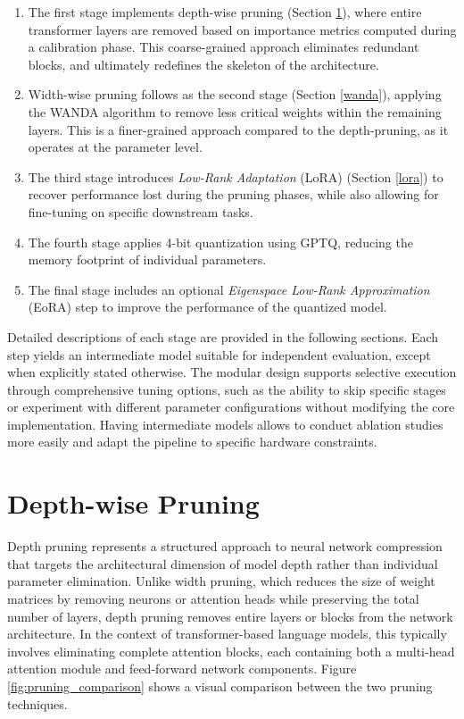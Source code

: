 \begin{enumerate}
    \item The first stage implements depth-wise pruning (Section \ref{depth_pruning}), where entire transformer layers are removed based on importance metrics computed during a calibration phase. This coarse-grained approach eliminates redundant blocks, and ultimately redefines the skeleton of the architecture.

    \item Width-wise pruning follows as the second stage (Section \ref{wanda}), applying the WANDA algorithm to remove less critical weights within the remaining layers. This is a finer-grained approach compared to the depth-pruning, as it operates at the parameter level.

    \item The third stage introduces \textit{Low-Rank Adaptation} (LoRA) (Section \ref{lora}) to recover performance lost during the pruning phases, while also allowing for fine-tuning on specific downstream tasks.

    \item The fourth stage applies 4-bit quantization using GPTQ, reducing the memory footprint of individual parameters.

    \item The final stage includes an optional \textit{Eigenspace Low-Rank Approximation} (EoRA) step to improve the performance of the quantized model.
\end{enumerate}

Detailed descriptions of each stage are provided in the following sections. Each step yields an intermediate model suitable for independent evaluation, except when explicitly stated otherwise. The modular design supports selective execution through comprehensive tuning options, such as the ability to skip specific stages or experiment with different parameter configurations without modifying the core implementation. Having intermediate models allows to conduct ablation studies more easily and adapt the pipeline to specific hardware constraints.

\section{Depth-wise Pruning} \label{depth_pruning}

Depth pruning represents a structured approach to neural network compression that targets the architectural dimension of model depth rather than individual parameter elimination. Unlike width pruning, which reduces the size of weight matrices by removing neurons or attention heads while preserving the total number of layers, depth pruning removes entire layers or blocks from the network architecture. In the context of transformer-based language models, this typically involves eliminating complete attention blocks, each containing both a multi-head attention module and feed-forward network components. Figure \ref{fig:pruning_comparison} shows a visual comparison between the two pruning techniques.

